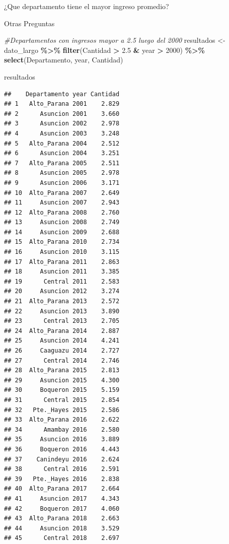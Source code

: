 \documentclass[
  ignorenonframetext,
]{beamer}
\newenvironment{Shaded}{\begin{snugshade}}{\end{snugshade}}
\newcommand{\CommentTok}[1]{\textcolor[rgb]{0.56,0.35,0.01}{\textit{#1}}}
\newcommand{\DecValTok}[1]{\textcolor[rgb]{0.00,0.00,0.81}{#1}}
\newcommand{\FloatTok}[1]{\textcolor[rgb]{0.00,0.00,0.81}{#1}}
\newcommand{\FunctionTok}[1]{\textcolor[rgb]{0.13,0.29,0.53}{\textbf{#1}}}
\newcommand{\NormalTok}[1]{#1}
\newcommand{\OtherTok}[1]{\textcolor[rgb]{0.56,0.35,0.01}{#1}}
\newcommand{\SpecialCharTok}[1]{\textcolor[rgb]{0.81,0.36,0.00}{\textbf{#1}}}
\begin{document}
\begin{frame}[fragile]{¿Que departamento tiene el mayor ingreso
promedio?}
\begin{block}{Otras Preguntas}
\protect\hypertarget{otras-preguntas}{}
\begin{Shaded}
\begin{Highlighting}[]
\CommentTok{\#Departamentos con ingresos mayor a 2.5 luego del 2000}
\NormalTok{resultados }\OtherTok{\textless{}{-}}\NormalTok{ dato\_largo }\SpecialCharTok{\%\textgreater{}\%}
  \FunctionTok{filter}\NormalTok{(Cantidad }\SpecialCharTok{\textgreater{}} \FloatTok{2.5} \SpecialCharTok{\&}\NormalTok{ year }\SpecialCharTok{\textgreater{}} \DecValTok{2000}\NormalTok{) }\SpecialCharTok{\%\textgreater{}\%}
  \FunctionTok{select}\NormalTok{(Departamento, year, Cantidad)}

\NormalTok{resultados}
\end{Highlighting}
\end{Shaded}

\begin{verbatim}
##    Departamento year Cantidad
## 1   Alto_Parana 2001    2.829
## 2      Asuncion 2001    3.660
## 3      Asuncion 2002    2.978
## 4      Asuncion 2003    3.248
## 5   Alto_Parana 2004    2.512
## 6      Asuncion 2004    3.251
## 7   Alto_Parana 2005    2.511
## 8      Asuncion 2005    2.978
## 9      Asuncion 2006    3.171
## 10  Alto_Parana 2007    2.649
## 11     Asuncion 2007    2.943
## 12  Alto_Parana 2008    2.760
## 13     Asuncion 2008    2.749
## 14     Asuncion 2009    2.688
## 15  Alto_Parana 2010    2.734
## 16     Asuncion 2010    3.115
## 17  Alto_Parana 2011    2.863
## 18     Asuncion 2011    3.385
## 19      Central 2011    2.583
## 20     Asuncion 2012    3.274
## 21  Alto_Parana 2013    2.572
## 22     Asuncion 2013    3.890
## 23      Central 2013    2.705
## 24  Alto_Parana 2014    2.887
## 25     Asuncion 2014    4.241
## 26     Caaguazu 2014    2.727
## 27      Central 2014    2.746
## 28  Alto_Parana 2015    2.813
## 29     Asuncion 2015    4.300
## 30     Boqueron 2015    5.159
## 31      Central 2015    2.854
## 32   Pte._Hayes 2015    2.586
## 33  Alto_Parana 2016    2.622
## 34      Amambay 2016    2.580
## 35     Asuncion 2016    3.889
## 36     Boqueron 2016    4.443
## 37    Canindeyu 2016    2.624
## 38      Central 2016    2.591
## 39   Pte._Hayes 2016    2.838
## 40  Alto_Parana 2017    2.664
## 41     Asuncion 2017    4.343
## 42     Boqueron 2017    4.060
## 43  Alto_Parana 2018    2.663
## 44     Asuncion 2018    3.529
## 45      Central 2018    2.697
\end{verbatim}
\end{block}


\end{frame}
\end{document}
